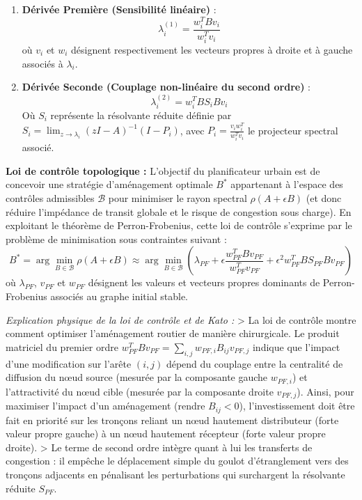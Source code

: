 \documentclass[10pt, a4paper]{article}
\providecommand{\tightlist}{}
\begin{document}
\begin{enumerate}
\def\labelenumi{\arabic{enumi}.}
\tightlist
\item
  \textbf{Dérivée Première (Sensibilité linéaire)} :
  \[\lambda_i^{(1)} = \frac{w_i^T B v_i}{w_i^T v_i}\] où \(v_i\) et
  \(w_i\) désignent respectivement les vecteurs propres à droite et à
  gauche associés à \(\lambda_i\).
\item
  \textbf{Dérivée Seconde (Couplage non-linéaire du second ordre)} :
  \[\lambda_i^{(2)} = w_i^T B S_i B v_i\] Où \(S_i\) représente la
  résolvante réduite définie par
  \(S_i = \lim_{z \to \lambda_i} (zI - A)^{-1}(I - P_i)\), avec
  \(P_i = \frac{v_i w_i^T}{w_i^T v_i}\) le projecteur spectral associé.
\end{enumerate}

\textbf{Loi de contrôle topologique :} L'objectif du planificateur
urbain est de concevoir une stratégie d'aménagement optimale \(B^*\)
appartenant à l'espace des contrôles admissibles \(\mathcal{B}\) pour
minimiser le rayon spectral \(\rho(A + \epsilon B)\) (et donc réduire
l'impédance de transit globale et le risque de congestion sous charge).
En exploitant le théorème de Perron-Frobenius, cette loi de contrôle
s'exprime par le problème de minimisation sous contraintes suivant :
\[B^* = \arg\min_{B \in \mathcal{B}} \rho(A + \epsilon B) \approx \arg\min_{B \in \mathcal{B}} \left( \lambda_{PF} + \epsilon \frac{w_{PF}^T B v_{PF}}{w_{PF}^T v_{PF}} + \epsilon^2 w_{PF}^T B S_{PF} B v_{PF} \right)\]
où \(\lambda_{PF}\), \(v_{PF}\) et \(w_{PF}\) désignent les valeurs et
vecteurs propres dominants de Perron-Frobenius associés au graphe
initial stable.

\emph{Explication physique de la loi de contrôle et de Kato :}
\textgreater{} La loi de contrôle montre comment optimiser l'aménagement
routier de manière chirurgicale. Le produit matriciel du premier ordre
\(w_{PF}^T B v_{PF} = \sum_{i,j} w_{PF, i} B_{ij} v_{PF, j}\) indique
que l'impact d'une modification sur l'arête \((i, j)\) dépend du
couplage entre la centralité de diffusion du nœud source (mesurée par la
composante gauche \(w_{PF, i}\)) et l'attractivité du nœud cible
(mesurée par la composante droite \(v_{PF, j}\)). Ainsi, pour maximiser
l'impact d'un aménagement (rendre \(B_{ij} < 0\)), l'investissement doit
être fait en priorité sur les tronçons reliant un nœud hautement
distributeur (forte valeur propre gauche) à un nœud hautement récepteur
(forte valeur propre droite). \textgreater{} Le terme de second ordre
intègre quant à lui les transferts de congestion : il empêche le
déplacement simple du goulot d'étranglement vers des tronçons adjacents
en pénalisant les perturbations qui surchargent la résolvante réduite
\(S_{PF}\).
\end{document}

